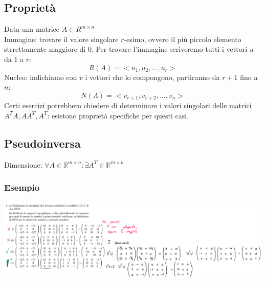\documentclass[10pt]{article}
\begin{document}
\subsection{Proprietà}
Data una matrice $A\in R^{m\times n}$\\
Immagine: trovare il valore singolare $r$-esimo, ovvero il più piccolo elemento strrettamente maggiore di 0. Per trovare l'immagine scriveremo tutti i vettori $u$ da 1 a $r$: \begin{equation*}
    R(A) = <u_{1}, u_{2}, \ldots, u_{r}>
\end{equation*}
Nucleo: indichiamo con $v$ i vettori che lo compongono, partiranno da $r+1$ fino a $n$:
\begin{equation*}
    N(A)=<v_{r+1}, v_{r+2}, \ldots, v_{n}>
\end{equation*}
Certi esercizi potrebbero chiedere di determinare i valori singolari delle matrici $A^{T}A, AA^{T}, A^{T}$: esistono proprietà specifiche per questi casi.
\subsection{Pseudoinversa}
Dimensione: $\forall A \in \mathbb{R}^{m\times n}: \exists A^{T}\in \mathbb{R}^{m\times n}$
\subsubsection*{Esempio}
\includegraphics[width=\textwidth]{svd.png}
\end{document}
